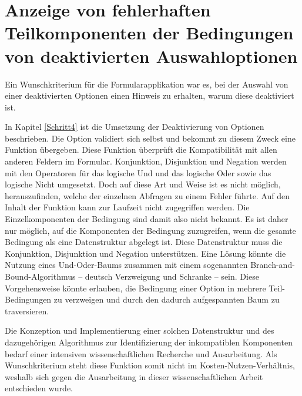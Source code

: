 \section{Anzeige von fehlerhaften Teilkomponenten der Bedingungen von deaktivierten Auswahloptionen}
\label{sec:Anzeige-von-fehlerhaften-Teilkomponenten-der-Bedingungen-von-deaktivierten-Auswahloptionen}


Ein Wunschkriterium für die Formularapplikation war es,
bei der Auswahl von einer deaktivierten Optionen einen Hinweis zu erhalten,
warum diese deaktiviert ist.

In Kapitel \ref{Schritt4} ist die Umsetzung der Deaktivierung von Optionen beschrieben.
Die Option validiert sich selbst und bekommt zu diesem Zweck eine Funktion übergeben. Diese Funktion überprüft die Kompatibilität mit allen anderen Feldern im Formular.
Konjunktion, Disjunktion und Negation werden mit den Operatoren für das logische Und und das logische Oder sowie das logische Nicht umgesetzt.
Doch auf diese Art und Weise ist es nicht möglich,
herauszufinden,
welche der einzelnen Abfragen zu einem Fehler führte.
Auf den Inhalt der Funktion kann zur Laufzeit nicht zugegriffen werden.
Die Einzelkomponenten der Bedingung sind damit also nicht bekannt. 
Es ist daher nur möglich,
auf die Komponenten der Bedingung zuzugreifen,
wenn die gesamte Bedingung als eine Datenstruktur abgelegt ist.
Diese Datenstruktur muss die Konjunktion, Disjunktion und Negation unterstützen. Eine Lösung könnte die Nutzung eines Und-Oder-Baums zusammen mit einem sogenannten Branch-and-Bound-Algorithmus -- deutsch Verzweigung und Schranke -- sein. Diese Vorgehensweise könnte erlauben, die Bedingung einer Option in mehrere Teil-Bedingungen zu verzweigen und durch den dadurch aufgespannten Baum zu traversieren. 


Die Konzeption und Implementierung einer solchen Datenstruktur und des dazugehörigen Algorithmus zur Identifizierung der inkompatiblen Komponenten bedarf einer intensiven wissenschaftlichen Recherche und Ausarbeitung.
Als Wunschkriterium steht diese Funktion somit nicht im Kosten-Nutzen-Verhältnis, weshalb sich gegen die Ausarbeitung in dieser wissenschaftlichen Arbeit entschieden wurde.

